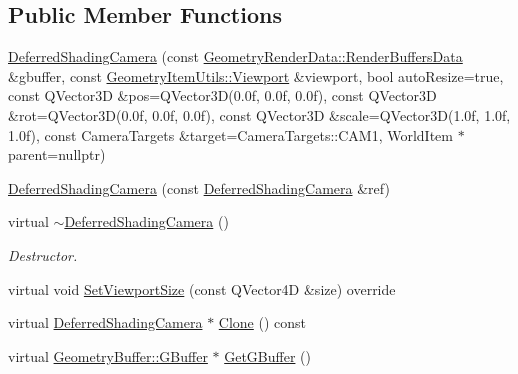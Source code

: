 \subsection*{Public Member Functions}
\begin{DoxyCompactItemize}
\item 
\mbox{\hyperlink{class_geometry_engine_1_1_geometry_world_item_1_1_geometry_camera_1_1_deferred_shading_camera_a4db0e4a5b0b5f0b24020897cb824fb57}{Deferred\+Shading\+Camera}} (const \mbox{\hyperlink{class_geometry_engine_1_1_geometry_render_data_1_1_render_buffers_data}{Geometry\+Render\+Data\+::\+Render\+Buffers\+Data}} \&gbuffer, const \mbox{\hyperlink{class_geometry_engine_1_1_geometry_item_utils_1_1_viewport}{Geometry\+Item\+Utils\+::\+Viewport}} \&viewport, bool auto\+Resize=true, const Q\+Vector3D \&pos=Q\+Vector3D(0.\+0f, 0.\+0f, 0.\+0f), const Q\+Vector3\+D \&rot=\+Q\+Vector3\+D(0.\+0f, 0.\+0f, 0.\+0f), const Q\+Vector3\+D \&scale=\+Q\+Vector3\+D(1.\+0f, 1.\+0f, 1.\+0f), const Camera\+Targets \&target=\+Camera\+Targets\+::\+C\+A\+M1, World\+Item $\ast$parent=nullptr)
\item 
\mbox{\hyperlink{class_geometry_engine_1_1_geometry_world_item_1_1_geometry_camera_1_1_deferred_shading_camera_a3fddaea07dd897fe83081ff45cf99416}{Deferred\+Shading\+Camera}} (const \mbox{\hyperlink{class_geometry_engine_1_1_geometry_world_item_1_1_geometry_camera_1_1_deferred_shading_camera}{Deferred\+Shading\+Camera}} \&ref)
\item 
\mbox{\label{class_geometry_engine_1_1_geometry_world_item_1_1_geometry_camera_1_1_deferred_shading_camera_ae5eb53c675d8a7ad9070853f4b5d4951}} 
virtual \mbox{\hyperlink{class_geometry_engine_1_1_geometry_world_item_1_1_geometry_camera_1_1_deferred_shading_camera_ae5eb53c675d8a7ad9070853f4b5d4951}{$\sim$\+Deferred\+Shading\+Camera}} ()
\begin{DoxyCompactList}\small\item\em Destructor. \end{DoxyCompactList}\item 
virtual void \mbox{\hyperlink{class_geometry_engine_1_1_geometry_world_item_1_1_geometry_camera_1_1_deferred_shading_camera_a16da38cfd723b755a63c372c08bbedf7}{Set\+Viewport\+Size}} (const Q\+Vector4D \&size) override
\item 
virtual \mbox{\hyperlink{class_geometry_engine_1_1_geometry_world_item_1_1_geometry_camera_1_1_deferred_shading_camera}{Deferred\+Shading\+Camera}} $\ast$ \mbox{\hyperlink{class_geometry_engine_1_1_geometry_world_item_1_1_geometry_camera_1_1_deferred_shading_camera_ac020fe14bc32f3fdbd0c9423af1c975f}{Clone}} () const
\item 
virtual \mbox{\hyperlink{class_geometry_engine_1_1_geometry_buffer_1_1_g_buffer}{Geometry\+Buffer\+::\+G\+Buffer}} $\ast$ \mbox{\hyperlink{class_geometry_engine_1_1_geometry_world_item_1_1_geometry_camera_1_1_deferred_shading_camera_aa37bfbf062ca20f0d41d5f29fbbc7959}{Get\+G\+Buffer}} ()
\end{DoxyCompactItemize}
